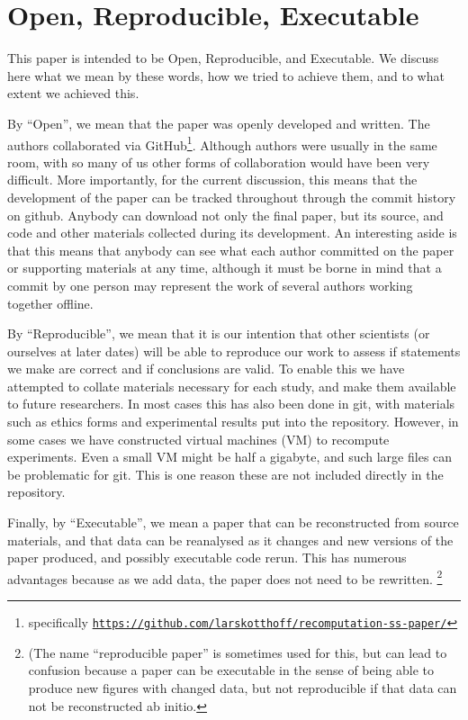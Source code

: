 \section{Open, Reproducible, Executable}

This paper is intended to be Open, Reproducible, and Executable.  We discuss here what we mean by these words, how we tried to achieve them, and to what extent we achieved this.

By ``Open'', we mean that the paper was openly developed and written.  The authors collaborated via GitHub\footnote{specifically
\texttt{\url{https://github.com/larskotthoff/recomputation-ss-paper/}}}.   Although authors were usually in the same room, with so many of us other forms of collaboration would have been very 
difficult.  More importantly, for the current discussion, this means that the development of the paper can be tracked throughout through the commit history on github.  Anybody can download not only the final paper, but its source, and code and other materials collected during its development.  An interesting aside is that this means that anybody can see what each author committed on the paper or supporting materials at any time, although it must be borne in mind that a commit by one person may represent the work of several authors working together offline.

By ``Reproducible'', we mean that it is our intention that other scientists (or ourselves at later dates) will be able to reproduce our work to assess if statements we make are correct and if conclusions are valid.  To enable this we have attempted to collate materials necessary for each study, and make them available to future researchers.  In most cases this has also been done in git, 
with materials such as ethics forms and experimental results put into the repository.  However, in some cases we have constructed virtual machines (VM) to recompute experiments.  Even a small VM 
might be half a gigabyte, and such large files can be problematic for git.  This is one reason these are not included directly in the repository.

Finally, by ``Executable'', we mean a paper that can be reconstructed from source 
materials, and that data can be reanalysed as it changes and new versions of the paper produced, and possibly executable code rerun.  
This has numerous advantages because as we add data, the paper does not need to be rewritten. 
\footnote{(The name ``reproducible paper'' is sometimes used for this, but can lead to confusion because a paper can be executable in the sense of being able to produce new figures with 
changed data, but not reproducible if that data can not be reconstructed ab initio.}



